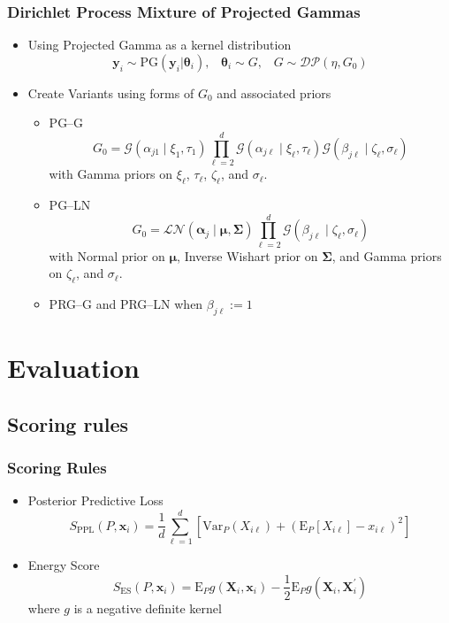 \documentclass[aspectratio=169]{beamer}
\begin{document}
\begin{frame}
  \frametitle{Dirichlet Process Mixture of Projected Gammas}
  \begin{itemize}
    \item Using Projected Gamma as a kernel distribution
      \[
       \bm{y}_i \sim \text{PG}(\bm{y}_i|\bm{\theta}_i) , \;\;\; \bm{\theta}_i \sim G, \;\;\; G \sim \mathcal{DP}(\eta, G_0)
      \]
    \item Create Variants using forms of $G_0$ and associated priors
      \begin{itemize}
        \item PG--G
          \[
            G_0 = \mathcal{G}(\alpha_{j1}\mid\xi_1,\tau_1)\prod_{\ell = 2}^d\mathcal{G}(\alpha_{j\ell}\mid\xi_\ell,\tau_\ell)\mathcal{G}(\beta_{j\ell}\mid\zeta_\ell,\sigma_{\ell})
          \]
          with Gamma priors on $\xi_\ell$, $\tau_{\ell}$, $\zeta_{\ell}$, and $\sigma_{\ell}$.
        \item PG--LN
          \[
            G_0 = \mathcal{LN}(\bm{\alpha}_j\mid \bm{\mu},\bm{\Sigma})\prod_{\ell = 2}^d\mathcal{G}(\beta_{j\ell}\mid\zeta_{\ell},\sigma_{\ell})
          \]
          with Normal prior on $\bm{\mu}$, Inverse Wishart prior on $\bm{\Sigma}$, and Gamma priors on $\zeta_{\ell}$, and $\sigma_{\ell}$.
        \item PRG--G and PRG--LN when $\beta_{j\ell} := 1$
      \end{itemize}
  \end{itemize}
\end{frame}

\section{Evaluation}
\subsection{Scoring rules}
\begin{frame}
  \frametitle{Scoring Rules}
  \begin{itemize}
    \item Posterior Predictive Loss
      \[
        S_{\text{PPL}}\left(P,\bm{x}_i\right) =
          \frac{1}{d}\sum_{\ell = 1}^d\left[\text{Var}_P\left(X_{i\ell}\right) +
          \left(\text{E}_P\left[X_{i\ell}\right] - x_{i\ell}\right)^2\right]
      \]
    \pause
    \item Energy Score
      \[
        S_{\text{ES}}\left(P, \bm{x}_i\right) =
          \text{E}_P g\left(\bm{X}_i, \bm{x}_i\right) -
          \frac{1}{2}\text{E}_P g\left(\bm{X}_i,\bm{X}_i^{\prime}\right)
      \]
      where $g$ is a negative definite kernel
  \end{itemize}
\end{frame}
\end{document}
